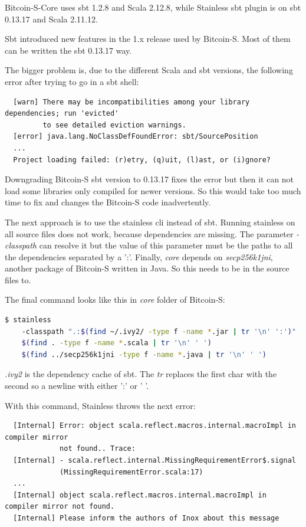 \documentclass[runningheads]{llncs}
\begin{document}
Bitcoin-S-Core uses sbt 1.2.8 and Scala 2.12.8, while Stainless sbt
plugin is on sbt 0.13.17 and Scala 2.11.12.

Sbt introduced new features in the 1.x release used by Bitcoin-S.
Most of them can be written the sbt 0.13.17 way.

The bigger problem is, due to the different Scala and sbt versions,
the following error after trying to go in a sbt shell:
\begin{verbatim}
  [warn] There may be incompatibilities among your library dependencies; run 'evicted'
         to see detailed eviction warnings.
  [error] java.lang.NoClassDefFoundError: sbt/SourcePosition
  ...
  Project loading failed: (r)etry, (q)uit, (l)ast, or (i)gnore?
\end{verbatim}

Downgrading Bitcoin-S sbt version to 0.13.17 fixes the error but then
it can not load some libraries only compiled for newer versions.  So
this would take too much time to fix and changes the Bitcoin-S code
inadvertently.

The next approach is to use the stainless cli instead of sbt.  Running
stainless on all source files does not work, because dependencies are
missing.  The parameter \emph{-classpath} can resolve it but the value
of this parameter must be the paths to all the dependencies separated
by a ':'.  Finally, \emph{core} depends on \emph{secp256k1jni},
another package of Bitcoin-S written in Java.  So this needs to be in
the source files to.

The final command looks like this in \emph{core} folder of Bitcoin-S:
\begin{lstlisting}[language=bash]
  $ stainless
    -classpath ".:$(find ~/.ivy2/ -type f -name *.jar | tr '\n' ':')"
    $(find . -type f -name *.scala | tr '\n' ' ')
    $(find ../secp256k1jni -type f -name *.java | tr '\n' ' ')
\end{lstlisting}

\emph{.ivy2} is the dependency cache of sbt.  The \emph{tr} replaces
the first char with the second so a newline with either ':' or ' '.

With this command, Stainless throws the next error:
\begin{verbatim}
  [Internal] Error: object scala.reflect.macros.internal.macroImpl in compiler mirror
             not found.. Trace:
  [Internal] - scala.reflect.internal.MissingRequirementError$.signal
             (MissingRequirementError.scala:17)
  ...
  [Internal] object scala.reflect.macros.internal.macroImpl in compiler mirror not found.
  [Internal] Please inform the authors of Inox about this message
\end{verbatim}
\end{document}
